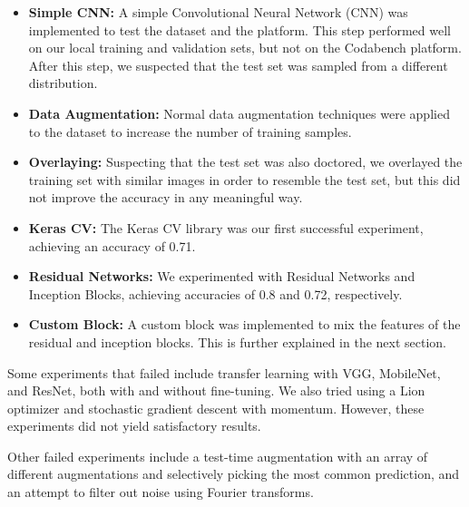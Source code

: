 \documentclass[11pt]{article}
\begin{document}
\begin{multicols}{2}
      \begin{itemize}
            \item \textbf{Simple CNN:} A simple Convolutional Neural Network
                  (CNN)
                  was implemented to test the dataset and the platform. This
                  step
                  performed well on our local training and validation sets, but
                  not
                  on the Codabench platform. After this step, we suspected that
                  the
                  test set was sampled from a different distribution.
            \item \textbf{Data Augmentation:} Normal data augmentation
                  techniques
                  were applied to the dataset to increase the number of
                  training
                  samples.
            \item \textbf{Overlaying:} Suspecting that the test set was also
                  doctored, we overlayed the training set with similar images
                  in
                  order to resemble the test set, but this did not improve the
                  accuracy in any meaningful way.
            \item \textbf{Keras CV:} The Keras CV library was our first
                  successful
                  experiment, achieving an accuracy of 0.71.
            \item \textbf{Residual Networks:} We experimented with Residual
                  Networks and Inception Blocks, achieving accuracies of 0.8
                  and
                  0.72, respectively.
            \item \textbf{Custom Block:} A custom block was implemented to
                  mix the features of the residual and inception blocks. This
                  is further explained in the next section.
      \end{itemize}

      Some experiments that failed include transfer learning with VGG,
      MobileNet,
      and ResNet, both with and without fine-tuning. We also tried using a Lion
      optimizer and stochastic gradient descent with momentum. However, these
      experiments did not yield satisfactory results.

      Other failed experiments include a test-time augmentation with an array
      of different augmentations and selectively picking the most common
      prediction, and an attempt to filter out noise using Fourier transforms.


\end{multicols}
\end{document}

